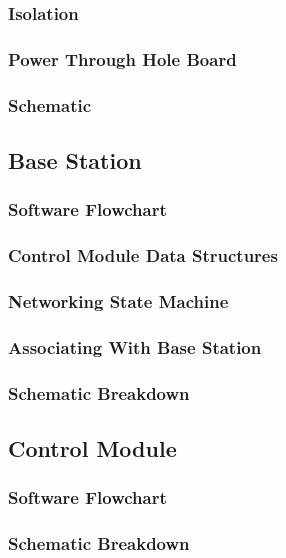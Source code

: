   \subsubsection{Isolation}
\lipsum[1]
  \subsubsection{Power Through Hole Board}
\lipsum[1]
  \subsubsection{Schematic}
\lipsum[1]
 \subsection{Base Station}
\lipsum[1]
  \subsubsection{Software Flowchart}
\lipsum[1]
  \subsubsection{Control Module Data Structures}
\lipsum[1]
  \subsubsection{Networking State Machine}
\lipsum[1]
  \subsubsection{Associating With Base Station}
\lipsum[1]
  \subsubsection{Schematic Breakdown}
\lipsum[1]
 \subsection{Control Module}
\lipsum[1]
  \subsubsection{Software Flowchart}
\lipsum[1]
  \subsubsection{Schematic Breakdown}
\lipsum[1]

